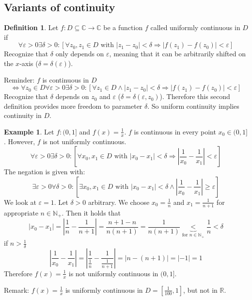 \documentclass[a4paper,landscape,twocolumn]{article}
\theoremstyle{definition}
\newtheorem{defi}{Definition}
\newtheorem{ex}{Example}
\newcommand\abs[1]{\left|#1\right|}
\begin{document}
\subsection{Variants of continuity}
%
\begin{defi}
  Let $f: D \subseteq \mathbb C \rightarrow \mathbb C$ be a function $f$
  called uniformly continuous in $D$ if
  \[
    \forall \varepsilon > 0 \exists \delta > 0:
    \left[
      \forall z_0, z_1 \in D \text{ with } \abs{z_1 - z_0} < \delta
      \Rightarrow \abs{f(z_1) - f(z_0)} < \varepsilon
    \right]
  \]
  Recognize that $\delta$ only depends on $\varepsilon$,
  meaning that it can be arbitrarily shifted on the $x$-axis ($\delta = \delta(\varepsilon)$).

  Reminder: $f$ is continuous in $D$
  \[
    \Leftrightarrow \forall z_0 \in D \forall \varepsilon > 0 \exists \delta > 0:
    \left[
      \forall z_1 \in D \land \abs{z_1 - z_0} < \delta
      \Rightarrow \abs{f(z_1) - f(z_0)} < \varepsilon
    \right]
  \]
  Recognize that $\delta$ depends on $z_0$ and $\varepsilon$
  ($\delta = \delta(\varepsilon, z_0)$).
  Therefore this second definition provides more freedom to parameter $\delta$.
  So uniform continuity implies continuity in $D$.
\end{defi}
%
\begin{ex}
  Let $f: (0, 1]$ and $f(x) = \frac1x$.
  $f$ is continuous in every point $x_0 \in (0, 1]$.
  However, $f$ is not uniformly continuous.
  \[
    \forall \varepsilon > 0 \exists \delta > 0:
    \left[
      \forall x_0, x_1 \in D \text{ with } \abs{x_0 - x_1} < \delta
      \Rightarrow \abs{\frac1{x_0} - \frac1{x_1}} < \varepsilon
    \right]
  \]
  The negation is given with:
  \[
    \exists \varepsilon > 0 \forall \delta > 0:
    \left[
      \exists x_0, x_1 \in D \text{ with }
      \abs{x_0 - x_1} < \delta \land \abs{\frac1{x_0} - \frac1{x_1}} \geq \varepsilon
    \right]
  \]
  We look at $\varepsilon = 1$.
  Let $\delta > 0$ arbitrary. We choose $x_0 = \frac1n$ and $x_1 = \frac1{n+1}$
  for appropriate $n \in \mathbb N_+$. Then it holds that
  \[
    \abs{x_0 - x_1} = \abs{\frac1n - \frac1{n+1}} =
    \frac{n + 1 - n}{n (n + 1)} = \frac1{n (n + 1)}
    \underbrace{<}_{\text{for } n \in \mathbb N_+}
    \frac1n
    <
    \delta
  \]
  if $n > \frac1\delta$
  \[
    \abs{\frac1{x_0} - \frac1{x_1}}
    = \abs{\frac1{\frac1n} - \frac1{\frac1{n+1}}}
    = \abs{n - (n + 1)}
    = \abs{-1}
    = 1
  \]
  Therefore $f(x) = \frac1x$ is not uniformly continuous in $(0, 1]$.

  Remark: $f(x) = \frac1x$ is uniformly continuous in $D = [\frac1{100}, 1]$,
  but not in $\mathbb R$.
\end{ex}
\end{document}
